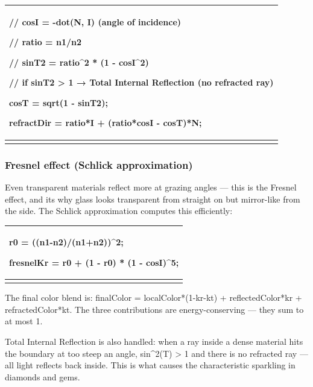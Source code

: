 \documentclass[
]{article}
\newcounter{none} %
\begin{document}
{\def\LTcaptype{none} %
\begin{longtable}[]{@{}
  >{\raggedright\arraybackslash}p{}@{}}
\toprule\noalign{}
\begin{minipage}[b]{\linewidth}\raggedright
// cosI = -dot(N, I) (angle of incidence)

// ratio = n1/n2

// sinT2 = ratio\^{}2 * (1 - cosI\^{}2)

// if sinT2 \textgreater{} 1 → Total Internal Reflection (no refracted
ray)

cosT = sqrt(1 - sinT2);

refractDir = ratio*I + (ratio*cosI - cosT)*N;
\end{minipage} \\
\midrule\noalign{}
\endhead
\bottomrule\noalign{}
\endlastfoot
\end{longtable}
}

\subsubsection{\texorpdfstring{\textbf{Fresnel effect (Schlick
approximation)}}{Fresnel effect (Schlick approximation)}}\label{fresnel-effect-schlick-approximation}

Even transparent materials reflect more at grazing angles --- this is
the Fresnel effect, and it\textquotesingle s why glass looks transparent
from straight on but mirror-like from the side. The Schlick
approximation computes this efficiently:

{\def\LTcaptype{none} %
\begin{longtable}[]{@{}
  >{\raggedright\arraybackslash}p{}@{}}
\toprule\noalign{}
\begin{minipage}[b]{\linewidth}\raggedright
r0 = ((n1-n2)/(n1+n2))\^{}2;

fresnelKr = r0 + (1 - r0) * (1 - cosI)\^{}5;
\end{minipage} \\
\midrule\noalign{}
\endhead
\bottomrule\noalign{}
\endlastfoot
\end{longtable}
}

The final color blend is: finalColor = localColor*(1-kr-kt) +
reflectedColor*kr + refractedColor*kt. The three contributions are
energy-conserving --- they sum to at most 1.

Total Internal Reflection is also handled: when a ray inside a dense
material hits the boundary at too steep an angle, sin\^{}2(T)
\textgreater{} 1 and there is no refracted ray --- all light reflects
back inside. This is what causes the characteristic sparkling in
diamonds and gems.
\end{document}
